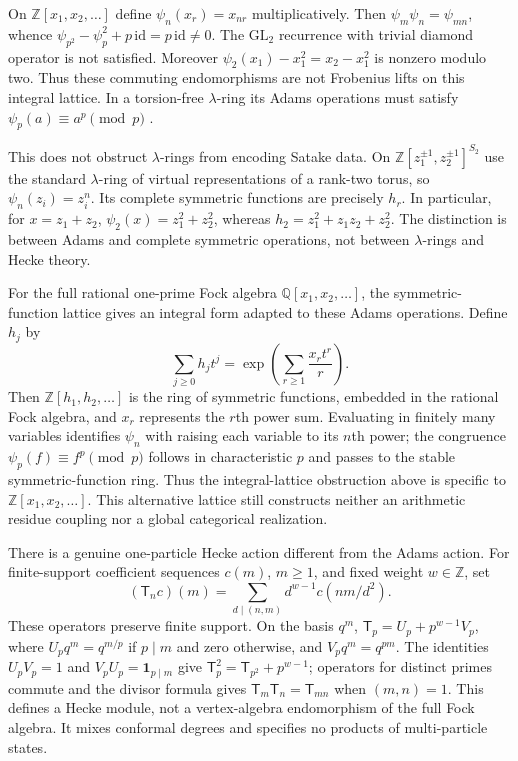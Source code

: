 \begin{example}
On $\mathbb Z[x_1,x_2,\ldots]$ define $\psi_n(x_r)=x_{nr}$ multiplicatively.
Then $\psi_m\psi_n=\psi_{mn}$, whence
$\psi_{p^2}-\psi_p^2+p\,\mathrm{id}=p\,\mathrm{id}\ne0$.
The $\mathrm{GL}_2$ recurrence with trivial diamond operator is not satisfied.
Moreover $\psi_2(x_1)-x_1^2=x_2-x_1^2$ is nonzero modulo two.
Thus these commuting endomorphisms are not Frobenius lifts on this integral
lattice.  In a torsion-free $\lambda$-ring its Adams operations must satisfy
$\psi_p(a)\equiv a^p\pmod p$ \cite{syn-arith:Wilkerson}.

This does not obstruct $\lambda$-rings from encoding Satake data.
On $\mathbb Z[z_1^{\pm1},z_2^{\pm1}]^{S_2}$ use the standard $\lambda$-ring
of virtual representations of a rank-two torus, so
$\psi_n(z_i)=z_i^n$.  Its complete symmetric functions are precisely $h_r$.
In particular, for $x=z_1+z_2$,
$\psi_2(x)=z_1^2+z_2^2$, whereas $h_2=z_1^2+z_1z_2+z_2^2$.
The distinction is between Adams and complete symmetric operations, not
between $\lambda$-rings and Hecke theory.
\end{example}

For the full rational one-prime Fock algebra $\mathbb Q[x_1,x_2,\ldots]$,
the symmetric-function lattice gives an integral form adapted to these
Adams operations.  Define $h_j$ by
\[
 \sum_{j\geq0}h_jt^j=\exp\left(\sum_{r\geq1}\frac{x_rt^r}{r}\right).
\]
Then $\mathbb Z[h_1,h_2,\ldots]$ is the ring of symmetric functions,
embedded in the rational Fock algebra, and $x_r$ represents the $r$th
power sum.  Evaluating in finitely many variables identifies
$\psi_n$ with raising each variable to its $n$th power; the congruence
$\psi_p(f)\equiv f^p\pmod p$ follows in characteristic $p$ and passes to
the stable symmetric-function ring.  Thus the integral-lattice obstruction
above is specific to $\mathbb Z[x_1,x_2,\ldots]$.  This alternative lattice
still constructs neither an arithmetic residue coupling nor a global
categorical realization.

There is a genuine one-particle Hecke action different from the Adams action.
For finite-support coefficient sequences $c(m)$, $m\geq1$, and fixed weight
$w\in\mathbb Z$, set
\[
 (\mathsf T_nc)(m)=\sum_{d\mid(n,m)}d^{w-1}c(nm/d^2).
\]
These operators preserve finite support.  On the basis $q^m$,
$\mathsf T_p=U_p+p^{w-1}V_p$, where $U_pq^m=q^{m/p}$ if $p\mid m$ and
zero otherwise, and $V_pq^m=q^{pm}$.
The identities $U_pV_p=1$ and
$V_pU_p=\mathbf1_{p\mid m}$ give
$\mathsf T_p^2=\mathsf T_{p^2}+p^{w-1}$; operators for distinct primes
commute and the divisor formula gives
$\mathsf T_m\mathsf T_n=\mathsf T_{mn}$ when $(m,n)=1$.
This defines a Hecke module, not a vertex-algebra endomorphism of the full
Fock algebra.  It mixes conformal degrees and specifies no products of
multi-particle states.

